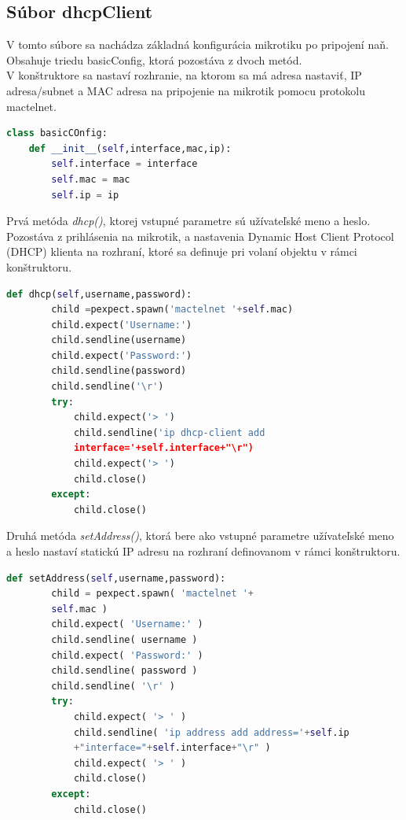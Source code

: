 \subsection{Súbor dhcpClient}
V tomto súbore sa nachádza základná konfigurácia mikrotiku po pripojení naň. Obsahuje triedu basicConfig, ktorá pozostáva z dvoch metód.\\
V konštruktore sa nastaví rozhranie, na ktorom sa má adresa nastaviť, IP adresa/subnet a MAC adresa na pripojenie na mikrotik pomocu protokolu mactelnet.
\begin{lstlisting}[language=python, frame=single, caption=Trieda basicConfig,captionpos=b, showstringspaces=false]
 class basicCOnfig:
    def __init__(self,interface,mac,ip):
        self.interface = interface
        self.mac = mac
        self.ip = ip
\end{lstlisting}
Prvá metóda \textit{dhcp()}, ktorej vstupné parametre sú užívateľské meno a heslo. Pozostáva z prihlásenia na mikrotik, a nastavenia Dynamic Host Client Protocol (DHCP) klienta na rozhraní, ktoré sa definuje pri volaní objektu v rámci konštruktoru.
\newpage
\begin{lstlisting}[language=python, frame=single, caption=Metóda dhcp,captionpos=b, showstringspaces=false]
 def dhcp(self,username,password):
        child =pexpect.spawn('mactelnet '+self.mac)
        child.expect('Username:')
        child.sendline(username)
        child.expect('Password:')
        child.sendline(password)
        child.sendline('\r')
        try:
            child.expect('> ')
            child.sendline('ip dhcp-client add 
            interface='+self.interface+"\r")
            child.expect('> ')
            child.close()
        except:
            child.close()
\end{lstlisting}
Druhá metóda \textit{setAddress()}, ktorá bere ako vstupné parametre užívateľské meno a heslo nastaví statickú IP adresu na rozhraní definovanom v rámci konštruktoru.
\begin{lstlisting}[language=python, frame=single, caption=Metóda setAddress,captionpos=b, showstringspaces=false]
 def setAddress(self,username,password):
        child = pexpect.spawn( 'mactelnet '+ 
        self.mac )
        child.expect( 'Username:' )
        child.sendline( username )
        child.expect( 'Password:' )
        child.sendline( password )
        child.sendline( '\r' )
        try:
            child.expect( '> ' )
            child.sendline( 'ip address add address='+self.ip 
            +"interface="+self.interface+"\r" )
            child.expect( '> ' )
            child.close()
        except:
            child.close()
\end{lstlisting}
